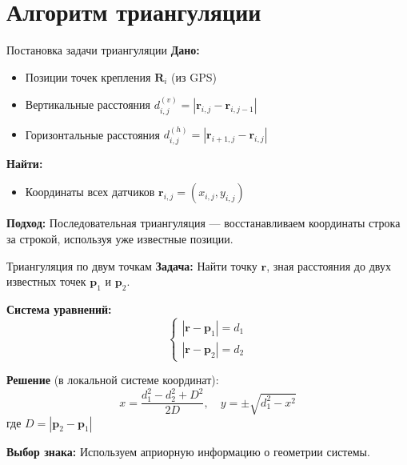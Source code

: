 \documentclass[aspectratio=169, 12pt]{beamer}
\begin{document}
\section{Алгоритм триангуляции}

\begin{frame}{Постановка задачи триангуляции}
    \textbf{Дано:}
    \begin{itemize}
        \item Позиции точек крепления $\mathbf{R}_i$ (из GPS)
        \item Вертикальные расстояния $d_{i,j}^{(v)} = |\mathbf{r}_{i,j} - \mathbf{r}_{i,j-1}|$
        \item Горизонтальные расстояния $d_{i,j}^{(h)} = |\mathbf{r}_{i+1,j} - \mathbf{r}_{i,j}|$
    \end{itemize}
    
    \vspace{0.5cm}
    \textbf{Найти:}
    \begin{itemize}
        \item Координаты всех датчиков $\mathbf{r}_{i,j} = (x_{i,j}, y_{i,j})$
    \end{itemize}
    
    \vspace{0.5cm}
    \textbf{Подход:} Последовательная триангуляция --- восстанавливаем координаты строка за строкой, используя уже известные позиции.
\end{frame}

\begin{frame}{Триангуляция по двум точкам}
    \textbf{Задача:} Найти точку $\mathbf{r}$, зная расстояния до двух известных точек $\mathbf{p}_1$ и $\mathbf{p}_2$.
    
    \vspace{0.3cm}
    \textbf{Система уравнений:}
    \[
    \begin{cases}
        |\mathbf{r} - \mathbf{p}_1| = d_1 \\
        |\mathbf{r} - \mathbf{p}_2| = d_2
    \end{cases}
    \]
    
    \vspace{0.3cm}
    \textbf{Решение} (в локальной системе координат):
    \[
    x = \frac{d_1^2 - d_2^2 + D^2}{2D}, \quad y = \pm\sqrt{d_1^2 - x^2}
    \]
    где $D = |\mathbf{p}_2 - \mathbf{p}_1|$
    
    \vspace{0.3cm}
    \textbf{Выбор знака:} Используем априорную информацию о геометрии системы.
\end{frame}
\end{document}
